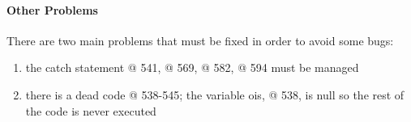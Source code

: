 \paragraph{Other Problems}

There are two main problems that must be fixed in order to avoid some bugs:

\begin{enumerate}
	\item the catch statement @ 541, @ 569, @ 582, @ 594 must be managed
	\item there is a dead code @ 538-545; the variable ois, @ 538, is null so the rest of the code is never executed
\end{enumerate} 
